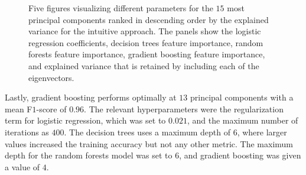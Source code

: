 \documentclass[superscriptaddress,unsortedaddress,
 amsmath,amssymb,
 aps,
]{revtex4-2}
\begin{document}
\begin{figure}[ht!]
  \begin{subfigure}[b]{0.5\textwidth}
    \centering
    
    \label{fig:03-fi-a}
  \end{subfigure}%
  
  \begin{subfigure}[b]{0.5\textwidth}
    \centering
    
    \label{fig:03-fi-b}
  \end{subfigure}%
  
  \begin{subfigure}[b]{0.5\textwidth}
    \centering
    
    \label{fig:03-fi-c}
  \end{subfigure}%
  
  \begin{subfigure}[b]{0.5\textwidth}
    \centering
    
    \label{fig:03-fi-d}
  \end{subfigure}%
  
  \begin{subfigure}[b]{0.5\textwidth}
    \centering
    
    \label{fig:03-fi-e}
  \end{subfigure}%
  
  \caption{Five figures visualizing different parameters for the $15$ most principal components ranked in descending order by the explained variance for the intuitive approach. The panels show the logistic regression coefficients, decision trees feature importance, random forests feature importance, gradient boosting feature importance, and explained variance that is retained by including each of the eigenvectors. }
  \label{fig:03-fi}
\end{figure}

Lastly, gradient boosting performs optimally at $13$ principal components with a mean F$1$-score of $0.96$. The relevant hyperparameters were the regularization term for logistic regression, which was set to $0.021$, and the maximum number of iterations as $400$. The decision trees uses a maximum depth of $6$, where larger values increased the training accuracy but not any other metric. The maximum depth for the random forests model was set to $6$, and gradient boosting was given a value of $4$. 
\end{document}

